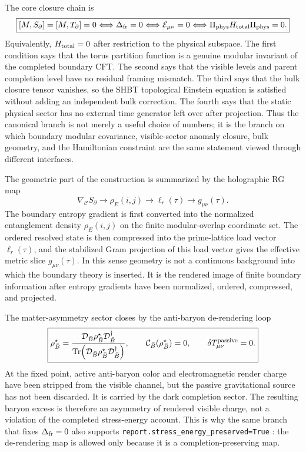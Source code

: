 \documentclass[11pt]{article}
\DeclareMathOperator{\Tr}{Tr}
\DeclareRobustCommand{\pyvar}[1]{%
  \ifmmode\text{\nolinkurl{#1}}\else\nolinkurl{#1}\fi%
}
\newcommand{\Deltafr}{\Delta_{\rm fr}}
\newcommand{\Ebulk}{\mathcal E_{\mu\nu}}
\newcommand{\Htotal}{H_{\rm total}}
\begin{document}
The core closure chain is
\begin{equation}
\label{eq:section-nine-closure-chain}
 \boxed{
 [M,S_{\partial}]=[M,T_{\partial}]=0
 \Longleftrightarrow
 \Deltafr=0
 \Longleftrightarrow
 \Ebulk=0
 \Longleftrightarrow
 \Pi_{\rm phys}\Htotal\Pi_{\rm phys}=0.
 }
\end{equation}
Equivalently, $\Htotal=0$ after restriction to the physical subspace.  The
first condition says that the torus partition function is a genuine modular
invariant of the completed boundary CFT.  The second says that the visible
levels and parent completion level have no residual framing mismatch.  The
third says that the bulk closure tensor vanishes, so the SHBT topological
Einstein equation is satisfied without adding an independent bulk correction.
The fourth says that the static physical sector has no external time generator
left over after projection.  Thus the canonical branch is not merely a useful
choice of numbers; it is the branch on which boundary modular covariance,
visible-sector anomaly closure, bulk geometry, and the Hamiltonian constraint
are the same statement viewed through different interfaces.

The geometric part of the construction is summarized by the holographic RG
map
\begin{equation}
\label{eq:section-nine-rg-map}
 \boxed{
 \nabla_{\mathcal C}S_{\partial}
 \longrightarrow
 \rho_E(i,j)
 \longrightarrow
 \ell_r(\tau)
 \longrightarrow
 g_{\mu\nu}(\tau).
 }
\end{equation}
The boundary entropy gradient is first converted into the normalized
entanglement density $\rho_E(i,j)$ on the finite modular-overlap coordinate
set.  The ordered resolved state is then compressed into the prime-lattice load
vector $\ell_r(\tau)$, and the stabilized Gram projection of this load vector
gives the effective metric slice $g_{\mu\nu}(\tau)$.  In this sense geometry is
not a continuous background into which the boundary theory is inserted.  It is
the rendered image of finite boundary information after entropy gradients have
been normalized, ordered, compressed, and projected.

The matter-asymmetry sector closes by the anti-baryon de-rendering loop
\begin{equation}
\label{eq:section-nine-baryogenesis-fixed-point}
 \boxed{
 \rho_{\bar B}^{\star}
 =
 \frac{
 \mathcal D_{\bar B}\rho_{\bar B}^{\star}\mathcal D_{\bar B}^{\dagger}}
 {\Tr\!\left(
 \mathcal D_{\bar B}\rho_{\bar B}^{\star}\mathcal D_{\bar B}^{\dagger}
 \right)},
 \qquad
 \mathcal C_{\bar B}(\rho_{\bar B}^{\star})=0,
 \qquad
 \delta T_{\mu\nu}^{\rm passive}=0.
 }
\end{equation}
At the fixed point, active anti-baryon color and electromagnetic render charge
have been stripped from the visible channel, but the passive gravitational
source has not been discarded.  It is carried by the dark completion sector.
The resulting baryon excess is therefore an asymmetry of rendered visible
charge, not a violation of the completed stress-energy account.  This is why
the same branch that fixes $\Deltafr=0$ also supports
\pyvar{report.stress_energy_preserved=True}: the de-rendering map is allowed only
because it is a completion-preserving map.
\end{document}
